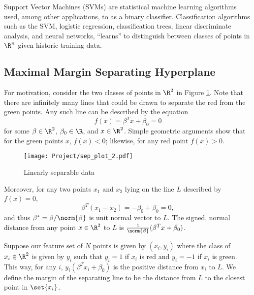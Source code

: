 \documentclass[10pt]{article}
\begin{document}


Support Vector Machines (SVMs) are statistical machine learning algorithms used, among other applications, to as a binary classifier. Classification algorithms such as the SVM, logistic regression, classification trees, linear discriminate analysis, and neural networks, ``learns'' to distinguish between classes of points in $\R^{n}$ given historic training data.

\subsection{Maximal Margin Separating Hyperplane} %
\label{ssub:maximal_margin_separating_hyperplane}

For motivation, consider the two classes of points in $\R^{2}$ in Figure \ref{fig:sep_plot_2}. Note that there are infinitely many lines that could be drawn to separate the red from the green points. Any such line can be described by the equation
\begin{equation}
	f(x)=\beta^{T} x+\beta_{0}=0
\end{equation}
for some $\beta\in \R^{2}$, $\beta_{0}\in \R$, and $x\in \R^{2}$. Simple geometric arguments show that for the green points $x$, $f(x)<0$; likewise, for any red point $f(x)>0$.

\begin{figure}[htb]
				\begin{center}
				\texttt{[image: Project/sep\_plot\_2.pdf]}
				\caption{Linearly separable data}
					\label{fig:sep_plot_2}
				\end{center}
				\end{figure}


Moreover, for any two points $x_{1}$ and $x_{2}$ lying on the line $L$ described by $f(x)=0$,
 \[
 	\beta^{T}(x_{1}-x_{2})=-\beta_{0}+\beta_{0}=0,
 \]
and thus $\beta^{*}=\beta/\norm{\beta}$ is unit normal vector to $L$. The signed, normal distance from any point $x\in \R^{2}$ to $L$ is $\frac{1}{\norm{\beta}}(\beta^{T}x+\beta_{0})$.

Suppose our feature set of $N$ points is given by $(x_{i},y_{i})$ where the class of $x_{i}\in\R^{2}$ is given by $y_{i}$ such that $y_{i}=1$ if $x_{i}$  is red and $y_{i}=-1$ if $x_{i}$ is green. This way, for any $i$, $y_{i}(\beta^{T}x_{i}+\beta_{0})$ is the positive distance from $x_{i}$ to $L$. We define the margin of the separating line to be the distance from $L$ to the closest point in $\set{x_{i}}$.
\end{document}
